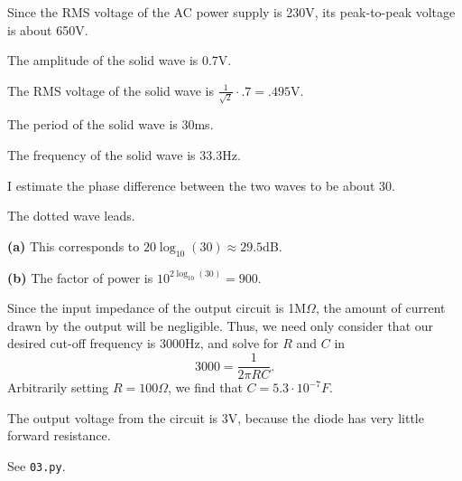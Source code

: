 \documentclass{article}
\begin{document}
    Since the RMS voltage of the AC power supply is 230V, its peak-to-peak voltage is about 650V.

\noindent{}

The amplitude of the solid wave is 0.7V.

The RMS voltage of the solid wave is $\frac{1}{\sqrt{2}}\cdot .7 = .495$V.

The period of the solid wave is 30ms.

The frequency of the solid wave is $33.3$Hz.

I estimate the phase difference between the two waves to be about 30\degree.

The dotted wave leads.

\noindent{}

{\bf (a)} This corresponds to $20\log_{10}(30) \approx 29.5$dB.

{\bf (b)} The factor of power is $10^{2\log_{10}(30)} = 900$.

\noindent{}

    Since the input impedance of the output circuit is 1M$\Omega$, the amount of current drawn by the output will be negligible.
    Thus, we need only consider that our desired cut-off frequency is 3000Hz, and solve for $R$ and $C$ in $$3000 = \frac{1}{2\pi RC}.$$
    Arbitrarily setting $R=100\Omega$, we find that $C=5.3 \cdot 10^{-7}F$.

\noindent{}

    The output voltage from the circuit is 3V, because the diode has very little forward resistance.

\noindent{}

    See \texttt{03.py}.
\end{document}
